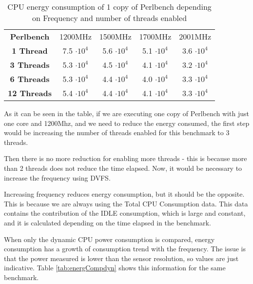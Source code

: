 \begin{table}[H]
\begin{center}
\begin{tabular}{ccccc}
  \bf Perlbench &  1200MHz & 1500MHz & 1700MHz & 2001MHz \\
  \bf 1 Thread &  7.5 $\cdot {10}^{4}$ & 5.6 $\cdot {10}^{4}$ & 5.1 $\cdot {10}^{4}$ & 3.6 $\cdot {10}^{4}$ \\
  \bf 3 Threads & 5.3 $\cdot {10}^{4}$ & 4.5 $\cdot {10}^{4}$ & 4.1 $\cdot {10}^{4}$ & 3.2 $\cdot {10}^{4}$ \\
  \bf 6 Threads & 5.3 $\cdot {10}^{4}$ & 4.4 $\cdot {10}^{4}$ & 4.0 $\cdot {10}^{4}$ & 3.3 $\cdot {10}^{4}$ \\
  \bf 12 Threads & 5.4 $\cdot {10}^{4}$ & 4.4 $\cdot {10}^{4}$ & 4.1 $\cdot {10}^{4}$ & 3.3 $\cdot {10}^{4}$ \\

\end{tabular}
\end{center}
\caption{CPU energy consumption of 1 copy of Perlbench depending on Frequency and number of threads enabled }
\label{tab:energComp}
\end{table}

As it can be seen in the table, if we are executing one copy of Perlbench with just one core and 1200Mhz, and we need to reduce the energy consumed, the first step would be increasing the number of threads enabled for this benchmark to 3 threads.

Then there is no more reduction for enabling more threads - this is because more than 2 threads does not reduce the time elapsed. Now, it would be necessary to increase the frequency using DVFS.

Increasing frequency reduces energy consumption, but it should be the opposite. This is because we are always using the Total CPU Consumption data. This data contains the contribution of the IDLE consumption, which is large and constant, and it is calculated depending on the time elapsed in the benchmark. 

When only the dynamic CPU power consumption is compared, energy consumption has a growth of consumption trend with the frequency. The issue is that the power measured is lower than the sensor resolution, so values are just indicative. 
Table \ref{tab:energCompdyn} shows this information for the same benchmark.

